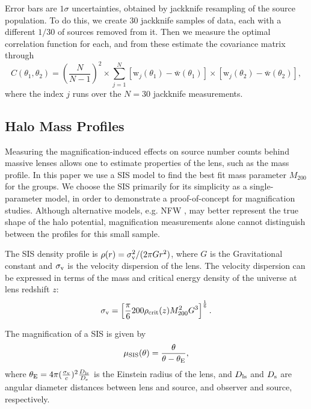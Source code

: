 Error bars are $1 \sigma$ uncertainties, obtained by jackknife resampling of the source population.  To do this, we create 30 jackknife samples of data, each with a different $1/30$ of sources removed from it.  Then we measure the optimal correlation function for each, and from these estimate the covariance matrix through
\begin{equation}
C(\theta_1, \theta_2)= \left( \frac{N}{N-1} \right)^2 \times \sum_{j=1}^N [\mathrm{w}_j(\theta_1)-\bar{\mathrm{w}}(\theta_1)] \times [\mathrm{w}_j(\theta_2)-\bar{\mathrm{w}}(\theta_2)],
\end{equation}
where the index $j$ runs over the $N=30$ jackknife measurements.

\subsection{Halo Mass Profiles}
Measuring the magnification-induced effects on source number counts behind massive lenses allows one to estimate properties of the lens, such as the mass profile.  In this paper we use a \ac{SIS} model to find the best fit mass parameter $M_{200}$ for the groups. We choose the \ac{SIS} primarily for its simplicity as a single-parameter model, in order to demonstrate a proof-of-concept for magnification studies.  Although alternative models, e.g. \acf{NFW} \citep{nfw97}, may better represent the true shape of the halo potential, magnification measurements alone cannot distinguish between the profiles for this small sample.

The \ac{SIS} density profile is $\rho(r)=\sigma_{\rm v}^2/(2 \pi G r^2)$, where $G$ is the Gravitational constant and $\sigma_{\rm v}$ is the velocity dispersion of the lens.  The velocity dispersion can be expressed in terms of the mass and critical energy density of the universe at lens redshift $z$:
\begin{equation}
\sigma_{\rm v} =\left[ \frac{\pi}{6}200\rho_{\rm crit}(z)M_{200}^2 G^3 \right]^\frac{1}{6} .
\end{equation}

The magnification of a \ac{SIS} is given by 
\begin{equation}
\mu_{\rm SIS}(\theta)=\frac{\theta}{\theta-\theta_{\rm E}},
\end{equation}
where $\theta_{\rm E}=4\pi(\frac{\sigma_{\rm v}}{c})^2\frac{D_{\rm ls}}{D_{\rm s}}$ is the Einstein radius of the lens, and $D_{\rm ls}$ and $D_{\rm s}$ are angular diameter distances between lens and source, and observer and source, respectively.

